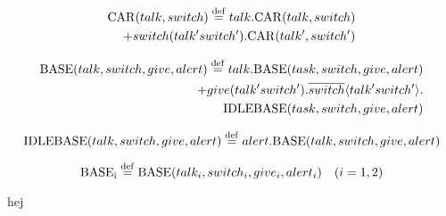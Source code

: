 \begin{equation}
\begin{split}
{\rm CAR}(talk, switch) \stackrel{\rm def}{=} talk . {\rm CAR}(talk, switch) \\
+ switch(talk' switch') . {\rm CAR}(talk', switch')\\
\end{split}
\end{equation}

\begin{equation}
\begin{split}
{\rm BASE}(talk, switch, give, alert) \stackrel{\rm def}{=} talk . {\rm BASE}(task, switch, give, alert) \\
+ give(talk' switch') . \overline{switch} \langle talk' switch' \rangle . \\
{\rm IDLEBASE}(task, switch, give, alert)
\end{split}
\end{equation}

\begin{equation}
{\rm IDLEBASE}(talk, switch, give, alert) \stackrel{\mathrm{def}}{=} alert.{\rm BASE}(talk,switch,give,alert)
\end{equation}

\begin{equation}
{\rm BASE_i} \stackrel{\mathrm{def}}{=} {\rm BASE}(talk_i , switch_i , give_i , alert_i) \quad (i=1,2)
\end{equation}

hej